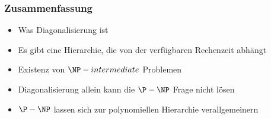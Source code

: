 \begin{frame}
	\frametitle{Zusammenfassung}
	\begin{itemize}
	  \item Was Diagonalisierung ist
	  \item Es gibt eine Hierarchie, die von der verf\"ugbaren Rechenzeit abhängt
	  \item Existenz von $\NP -intermediate$ Problemen
	  \item Diagonalisierung allein kann die $\P - \NP$ Frage nicht l\"osen
	  \item $\P - \NP$ lassen sich zur polynomiellen Hierarchie verallgemeinern
	\end{itemize}
\end{frame}